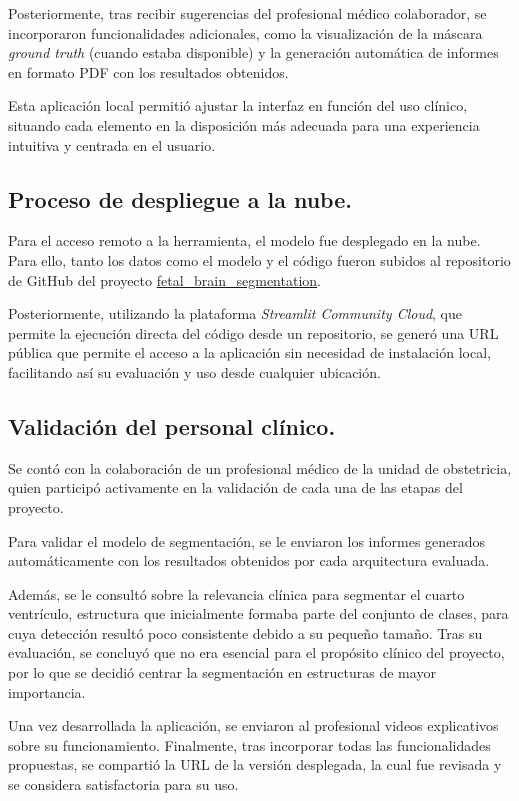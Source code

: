 Posteriormente, tras recibir sugerencias del profesional médico colaborador, se incorporaron funcionalidades adicionales, como la visualización de la máscara \textit{ground truth} (cuando estaba disponible) y la generación automática de informes en formato PDF con los resultados obtenidos.

Esta aplicación local permitió ajustar la interfaz en función del uso clínico, situando cada elemento en la disposición más adecuada para una experiencia intuitiva y centrada en el usuario.

\subsection{Proceso de despliegue a la nube.}
Para el acceso remoto a la herramienta, el modelo fue desplegado en la nube. Para ello, tanto los datos como el modelo y el código fueron subidos al repositorio de GitHub del proyecto \href{https://github.com/eirarodriguez/fetal_brain_segmentation} {fetal\_brain\_segmentation}. 

Posteriormente, utilizando la plataforma \textit{Streamlit Community Cloud}, que permite la ejecución directa del código desde un repositorio, se generó una URL pública que permite el acceso a la aplicación sin necesidad de instalación local, facilitando así su evaluación y uso desde cualquier ubicación.


\subsection{Validación del personal clínico.} 
Se contó con la colaboración de un profesional médico de la unidad de obstetricia, quien participó activamente en la validación de cada una de las etapas del proyecto.

Para validar el modelo de segmentación, se le enviaron los informes generados automáticamente con los resultados obtenidos por cada arquitectura evaluada. 

Además, se le consultó sobre la relevancia clínica para segmentar el cuarto ventrículo, estructura que inicialmente formaba parte del conjunto de clases, para cuya detección resultó poco consistente debido a su pequeño tamaño. Tras su evaluación, se concluyó que no era esencial para el propósito clínico del proyecto, por lo que se decidió centrar la segmentación en estructuras de mayor importancia.

Una vez desarrollada la aplicación, se enviaron al profesional videos explicativos sobre su funcionamiento. Finalmente, tras incorporar todas las funcionalidades propuestas, se compartió la URL de la versión desplegada, la cual fue revisada y se considera satisfactoria para su uso.

